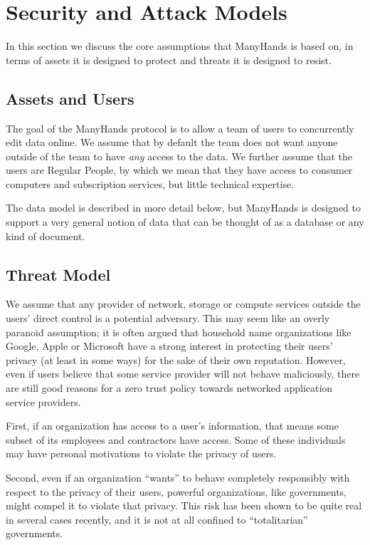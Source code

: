 \documentclass[pldi-cameraready,10pt]{sigplanconf-pldi16}
\begin{document}
\section{Security and Attack Models}

In this section we discuss the core assumptions that ManyHands is based on, in terms of assets it is designed to protect and threats it is designed to resist.

\subsection{Assets and Users}

The goal of the ManyHands protocol is to allow a team of users to concurrently edit data online.
We assume that by default the team does not want anyone outside of the team to have \emph{any} access to the data.
We further assume that the users are Regular People\texttrademark, by which we mean that they have access to consumer computers and subscription services, but little technical expertise.

The data model is described in more detail below, but ManyHands is designed to support a very general notion of data that can be thought of as a database or any kind of document.

\subsection{Threat Model}

We assume that any provider of network, storage or compute services outside the users' direct control is a potential adversary.
This may seem like an overly paranoid assumption; it is often argued that household name organizations like Google, Apple or Microsoft have a strong interest in protecting their users' privacy (at least in some ways) for the sake of their own reputation.
However, even if users believe that some service provider will not behave maliciously, there are still good reasons for a zero trust policy towards networked application service providers.

First, if an organization has access to a user's information, that means some subset of its employees and contractors have access.
Some of these individuals may have personal motivations to violate the privacy of users.

Second, even if an organization ``wants'' to behave completely responsibly with respect to the privacy of their users, powerful organizations, like governments, might compel it to violate that privacy.
This risk has been shown to be quite real in several cases recently, and it is not at all confined to ``totalitarian'' governments.
\end{document}
